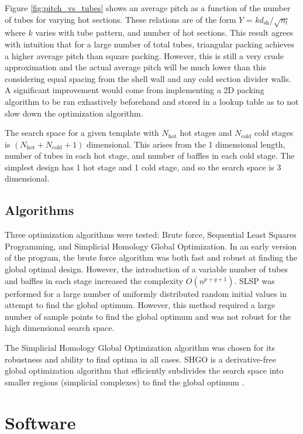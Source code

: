 \documentclass{article}
\begin{document}
Figure \ref{fig:pitch_vs_tubes} shows an average pitch as a function of the number of tubes for varying hot sections.
These relations are of the form $Y$ = $k d_\text{sh} /\sqrt{n_t}$ where $k$ varies with tube pattern, and number of hot sections.
This result agrees with intuition that for a large number of total tubes, triangular packing achieves a higher average pitch than square packing.
However, this is still a very crude approximation and the actual average pitch will be much lower than this considering equal spacing from the shell wall and any cold section divider walls.
A significant improvement would come from implementing a 2D packing algorithm to be ran exhastively beforehand and stored in a lookup table as to not slow down the optimization algorithm.

The search space for a given template with $N_\text{hot}$ hot stages and $N_\text{cold}$ cold stages is $(N_\text{hot} + N_\text{cold} + 1)$ dimensional.
This arises from the 1 dimensional length, number of tubes in each hot stage, and number of baffles in each cold stage.
The simplest design has 1 hot stage and 1 cold stage, and so the search space is 3 dimensional.

\subsection{Algorithms}
Three optimization algorithms were tested: Brute force, Sequential Least Squares Programming, and Simplicial Homology Global Optimization.
In an early version of the program, the brute force algorithm was both fast and robust at finding the global optimal design.
However, the introduction of a variable number of tubes and baffles in each stage increased the complexity $O(n^{p+q+1})$.
SLSP was performed for a large number of uniformly distributed random initial values in attempt to find the global optimum.
However, this method required a large number of sample points to find the global optimum and was not robust for the high dimensional search space.

The Simplicial Homology Global Optimization algorithm was chosen for its robustness and ability to find optima in all cases.
SHGO is a derivative-free global optimization algorithm that efficiently subdivides the search space into smaller regions (simplicial complexes) to find the global optimum \cite{SHGO}.

\section{Software}
\end{document}
